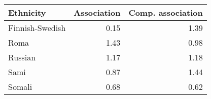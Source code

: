 \begin{tabular}{lrr}
\toprule
      Ethnicity &  Association &  Comp. association \\
\midrule
Finnish-Swedish &         0.15 &               1.39 \\
           Roma &         1.43 &               0.98 \\
        Russian &         1.17 &               1.18 \\
           Sami &         0.87 &               1.44 \\
         Somali &         0.68 &               0.62 \\
\bottomrule
\end{tabular}
